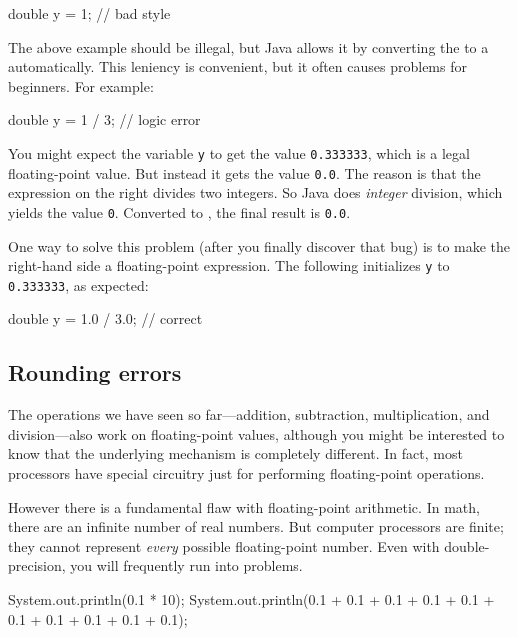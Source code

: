 \begin{code}
    double y = 1;  // bad style
\end{code}

The above example should be illegal, but Java allows it by converting the  to a  automatically.
This leniency is convenient, but it often causes problems for beginners. For example:

\begin{code}
    double y = 1 / 3;  // logic error
\end{code}

You might expect the variable {\tt y} to get the value {\tt 0.333333}, which is a legal floating-point value.
But instead it gets the value {\tt 0.0}.
The reason is that the expression on the right divides two integers.
So Java does {\em integer} division, which yields the value {\tt 0}.
Converted to , the final result is {\tt 0.0}.

One way to solve this problem (after you finally discover that bug) is to make the right-hand side a floating-point expression. The following initializes {\tt y} to {\tt 0.333333}, as expected:

\begin{code}
    double y = 1.0 / 3.0;  // correct
\end{code}

\subsection{Rounding errors}


The operations we have seen so far---addition, subtraction, multiplication, and division---also work on floating-point values, although you might be interested to know that the underlying mechanism is completely different.
In fact, most processors have special circuitry just for performing floating-point operations.

However there is a fundamental flaw with floating-point arithmetic.
In math, there are an infinite number of real numbers.
But computer processors are finite; they cannot represent {\em every} possible floating-point number.
Even with double-precision, you will frequently run into problems.

\begin{code}
    System.out.println(0.1 * 10);
    System.out.println(0.1 + 0.1 + 0.1 + 0.1 + 0.1
                     + 0.1 + 0.1 + 0.1 + 0.1 + 0.1);
\end{code}


